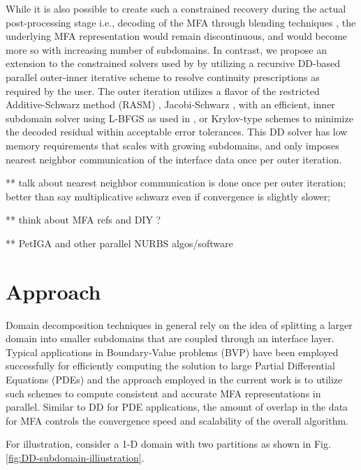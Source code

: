 \documentclass[conference]{IEEEtran}
\begin{document}
While it is also possible to create such a constrained recovery during the actual post-processing stage i.e., decoding of the MFA through blending techniques \cite{grindeanu-blending}, the underlying MFA representation would remain discontinuous, and would become more so with increasing number of subdomains. In contrast, we propose an extension to the constrained solvers used by \cite{zhang-nurbs-continuity, xu-jahn-discrete-adjoint} by utilizing a recursive DD-based parallel outer-inner iterative scheme to resolve continuity prescriptions as required by the user. The outer iteration utilizes a flavor of the restricted Additive-Schwarz method (RASM) \cite{gander-rasm}, Jacobi-Schwarz \cite{smith-ddm}, with an efficient, inner subdomain solver using L-BFGS as used in \cite{zheng-bo-bspline-bfgs}, or Krylov-type schemes to minimize the decoded residual within acceptable error tolerances. This DD solver has low memory requirements that scales with growing subdomains, and only imposes nearest neighbor communication of the interface data once per outer iteration. 

** talk about nearest neighbor communication is done once per outer iteration; better than say multiplicative schwarz even if convergence is slightly slower; 

** think about MFA refs and DIY ?

** PetIGA and other parallel NURBS algos/software

\section{Approach}

Domain decomposition techniques in general rely on the idea of splitting a larger domain into smaller subdomains that are coupled through an interface layer. Typical applications in Boundary-Value problems (BVP) \cite{smith-ddm} have been employed successfully for efficiently computing the solution to large Partial Differential Equations (PDEs) and the approach employed in the current work is to utilize such schemes to compute consistent and accurate MFA representations in parallel. Similar to DD for PDE applications, the amount of overlap in the data for MFA controls the convergence speed and scalability of the overall algorithm.

For illustration, consider a 1-D domain with two partitions as shown in Fig. \ref{fig:DD-subdomain-illiustration}.

\end{document}
